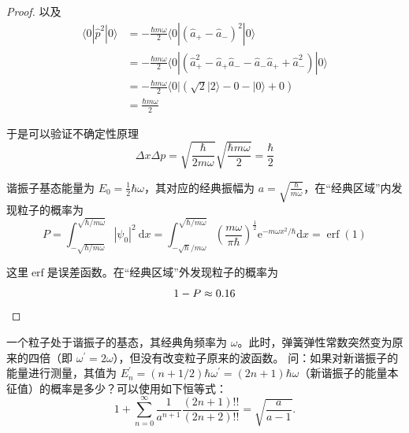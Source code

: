 \begin{proof}
以及
$$
\begin{aligned}
\langle 0| \hat{p}^{2}|0\rangle & =-\frac{\hbar m \omega}{2}\langle 0|\left(\hat{a}_{+}-\hat{a}_{-}\right)^{2}|0\rangle \\
& =-\frac{\hbar m \omega}{2}\langle 0|\left(\hat{a}_{+}^{2}-\hat{a}_{+} \hat{a}_{-}-\hat{a}_{-} \hat{a}_{+}+\hat{a}_{-}^{2}\right)|0\rangle \\
& =-\frac{\hbar m \omega}{2}\langle 0|(\sqrt{2}|2\rangle-0-|0\rangle+0) \\
& =\frac{\hbar m \omega}{2}
\end{aligned}
$$

于是可以验证不确定性原理
$$\Delta x \Delta p=\sqrt{\frac{\hbar}{2 m \omega}} \sqrt{\frac{\hbar m \omega}{2}}=\frac{\hbar}{2}$$

谐振子基态能量为 $E_{0}=\frac{1}{2} \hbar \omega$，其对应的经典振幅为 $a=\sqrt{\frac{\hbar}{m \omega}}$，在``经典区域''内发现粒子的概率为
$$P=\int_{-\sqrt{\hbar / m \omega}}^{\sqrt{\hbar / m \omega}}|\psi_{0}|^{2} \mathrm{~d} x
=\int_{-\sqrt{\hbar} / m \omega}^{\sqrt{\hbar / m \omega}}\left(\frac{m \omega}{\pi \hbar}\right)^{\frac{1}{2}} \mathrm{e}^{-m \omega x^{2} / \hbar} \mathrm{d} x=\operatorname{erf}(1)$$

这里$\operatorname{erf}$是误差函数。在``经典区域''外发现粒子的概率为
$$1-P \approx 0.16\qedhere$$
\end{proof}
\begin{5}
    一个粒子处于谐振子的基态，其经典角频率为 $\omega$。此时，弹簧弹性常数突然变为原来的四倍（即 $\omega^{\prime}=2 \omega$），但没有改变粒子原来的波函数。
    问：如果对新谐振子的能量进行测量，其值为 $E_{n}^{\prime}=(n+1/2) \hbar \omega^{\prime}=(2n+1) \hbar \omega$（新谐振子的能量本征值）的概率是多少？可以使用如下恒等式：
$$1+\sum_{n=0}^{\infty} \frac{1}{a^{n+1}} \frac{(2n+1)!!}{(2n+2)!!}
=\sqrt{\frac{a}{a-1}}.$$
\end{5}
